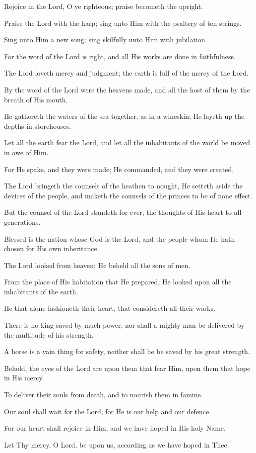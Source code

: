Rejoice in the Lord, O ye righteous; praise becometh the upright.

Praise the Lord with the harp; sing unto Him with the psaltery of ten strings.

Sing unto Him a new song; sing skilfully unto Him with jubilation.

For the word of the Lord is right, and all His works are done in faithfulness.

The Lord loveth mercy and judgment; the earth is full of the mercy of the Lord.

By the word of the Lord were the heavens made, and all the host of them by the breath of His mouth.

He gathereth the waters of the sea together, as in a wineskin; He layeth up the depths in storehouses.

Let all the earth fear the Lord, and let all the inhabitants of the world be moved in awe of Him.

For He spake, and they were made; He commanded, and they were created.

The Lord bringeth the counsels of the heathen to nought, He setteth aside the devices of the people, and maketh the counsels of the princes to be of none effect.

But the counsel of the Lord standeth for ever, the thoughts of His heart to all generations.

Blessed is the nation whose God is the Lord, and the people whom He hath chosen for His own inheritance.

The Lord looked from heaven; He beheld all the sons of men.

From the place of His habitation that He prepared, He looked upon all the inhabitants of the earth.

He that alone fashioneth their heart, that considereth all their works.

There is no king saved by much power, nor shall a mighty man be delivered by the multitude of his strength.

A horse is a vain thing for safety, neither shall he be saved by his great strength.

Behold, the eyes of the Lord are upon them that fear Him, upon them that hope in His mercy.

To deliver their souls from death, and to nourish them in famine.

Our soul shall wait for the Lord, for He is our help and our defence.

For our heart shall rejoice in Him, and we have hoped in His holy Name.

Let Thy mercy, O Lord, be upon us, according as we have hoped in Thee.
